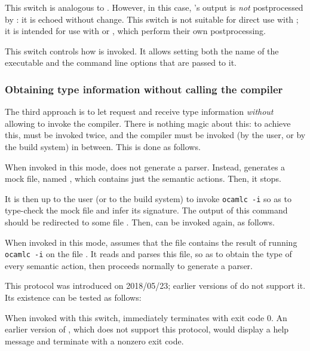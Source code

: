 \documentclass[onecolumn,11pt,nocopyrightspace,preprint]{sigplanconf}
\begin{document}
\docswitch{\orawdepend} This switch is analogous to \odepend. However, in this
case, \ocamldep's output is \emph{not} postprocessed by \menhir: it is echoed
without change. This switch is not suitable for direct use with \make; it is
intended for use with \omake or \ocamlbuild, which perform their own
postprocessing.

 This switch controls how \ocamldep is
invoked. It allows setting both the name of the executable and the command
line options that are passed to it.

\subsubsection{Obtaining \ocaml type information without calling the \ocaml compiler}
\label{sec:build:infer:indirect}

The third approach is to let \menhir request and receive \ocaml type
information \emph{without} allowing \menhir to invoke the \ocaml compiler.
There is nothing magic about this: to achieve this, \menhir must be invoked
twice, and the \ocaml compiler must be invoked (by the user, or by the build
system) in between. This is done as follows.

 When invoked in this mode, \menhir does
not generate a parser. Instead, generates a mock \ml file, named
, which contains just the semantic actions. Then, it stops.

\docskip

It is then up to the user (or to the build system) to invoke \verb+ocamlc -i+
so as to type-check the mock \ml file and infer its signature. The output of
this command should be redirected to some file . Then, \menhir
can be invoked again, as follows.

 When invoked in this mode, \menhir
assumes that the file  contains the result of running
\verb+ocamlc -i+ on the file . It reads and parses this file,
so as to obtain the \ocaml type of every semantic action, then proceeds
normally to generate a parser.

\docskip

This protocol was introduced on 2018/05/23; earlier versions of \menhir do not
support it. Its existence can be tested as follows:

\docswitch{\oinferprotocolsupported} When invoked with this switch,
\menhir immediately terminates with exit code 0. An earlier version
of \menhir, which does not support this protocol, would display a
help message and terminate with a nonzero exit code.
\end{document}
